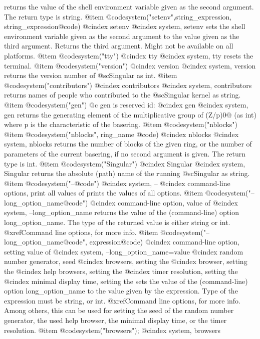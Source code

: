 {{{{{{{returns the value of the shell environment variable given as the second
argument. The return type is string.
@item @code{system("setenv",}string_expression, string_expression@code{)}
@cindex setenv
@cindex system, setenv
sets the shell environment variable given as the second argument to the
value given as the third argument. Returns the third argument. Might not
be available on all platforms.
@item @code{system("tty")}
@cindex tty
@cindex system, tty
resets the terminal.
@item @code{system("version")}
@cindex version
@cindex system, version
returns the version number of  @sc{Singular} as int.
@item @code{system("contributors")}
@cindex contributors
@cindex system, contributors
returns names of people who contributed to the @sc{Singular} kernel as string.
@item @code{system("gen")}
@c gen is reserved id: @cindex gen
@cindex system, gen
returns the generating element of the multiplicative
group of (Z/p)\@{0@} (as int) where p is the characteristic of the
basering.
@item @code{system("nblocks")}
@item @code{system("nblocks",} ring_name @code{)}
@cindex nblocks
@cindex system, nblocks
returns the number of blocks of the given ring, or the number of parameters
of the current basering, if no second argument is given. The return type
is int.
@item @code{system("Singular")}
@cindex Singular
@cindex system, Singular
returns the absolute (path) name of the running @sc{Singular} as string.
@item @code{system("}--@code{")}
@cindex system, --
@cindex command-line options, print all values of
prints the values of all options.
@item @code{system("}--long_option_name@code{")}
@cindex command-line option, value of
@cindex system, --long_option_name
returns the value of the (command-line) option long_option_name. The
type of the returned value is either string or int.
@xref{Command line options}, for more info.
@item @code{system("}--long_option_name@code{",} expression@code{)}
@cindex command-line option, setting value of
@cindex system, --long_option_name=value
@cindex random number generator, seed
@cindex browsers, setting the
@cindex browser, setting the
@cindex help browsers, setting the
@cindex timer resolution, setting the
@cindex minimal display time, setting the
sets the value of the (command-line) option long_option_name to the
value given by the expression. Type of the expression must be string, or
int.  @xref{Command line options}, for more info. Among others,
this can be used for setting the seed of the random number generator,
the used help browser, the minimal display time, or the timer
resolution.
@item @code{system("browsers");}
@cindex system, browsers
}}}}}}}
